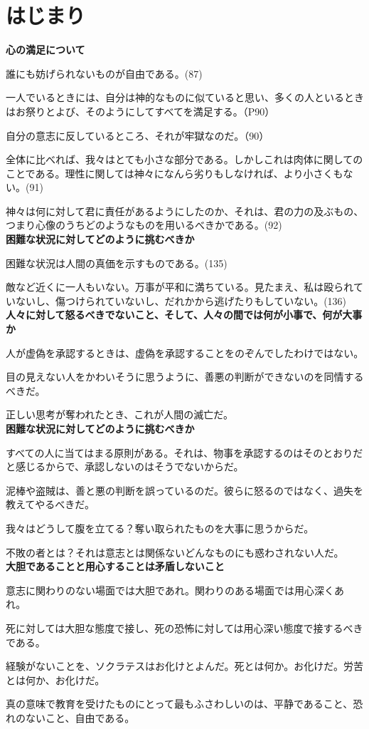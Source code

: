 \chapter{はじまり}
\textbf{心の満足について}

誰にも妨げられないものが自由である。(87)

一人でいるときには、自分は神的なものに似ていると思い、多くの人といるときはお祭りとよび、そのようにしてすべてを満足する。（P90）

自分の意志に反しているところ、それが牢獄なのだ。（90）

全体に比べれば、我々はとても小さな部分である。しかしこれは肉体に関してのことである。理性に関しては神々になんら劣りもしなければ、より小さくもない。(91)

神々は何に対して君に責任があるようにしたのか、それは、君の力の及ぶもの、つまり心像のうちどのようなものを用いるべきかである。(92)
\\

\textbf{困難な状況に対してどのように挑むべきか}

困難な状況は人間の真価を示すものである。(135)

敵など近くに一人もいない。万事が平和に満ちている。見たまえ、私は殴られていないし、傷つけられていないし、だれかから逃げたりもしていない。(136)
\\

\textbf{人々に対して怒るべきでないこと、そして、人々の間では何が小事で、何が大事か}

人が虚偽を承認するときは、虚偽を承認することをのぞんでしたわけではない。

目の見えない人をかわいそうに思うように、善悪の判断ができないのを同情するべきだ。

正しい思考が奪われたとき、これが人間の滅亡だ。\\


\textbf{困難な状況に対してどのように挑むべきか}

すべての人に当てはまる原則がある。それは、物事を承認するのはそのとおりだと感じるからで、承認しないのはそうでないからだ。

泥棒や盗賊は、善と悪の判断を誤っているのだ。彼らに怒るのではなく、過失を教えてやるべきだ。

我々はどうして腹を立てる？奪い取られたものを大事に思うからだ。

不敗の者とは？それは意志とは関係ないどんなものにも惑わされない人だ。
\\


\textbf{大胆であることと用心することは矛盾しないこと}

意志に関わりのない場面では大胆であれ。関わりのある場面では用心深くあれ。

死に対しては大胆な態度で接し、死の恐怖に対しては用心深い態度で接するべきである。

経験がないことを、ソクラテスはお化けとよんだ。死とは何か。お化けだ。労苦とは何か、お化けだ。

真の意味で教育を受けたものにとって最もふさわしいのは、平静であること、恐れのないこと、自由である。

